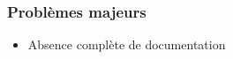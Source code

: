 \documentclass{beamer}
\begin{document}
\begin{frame}
    \frametitle{Problèmes majeurs}

    \begin{itemize}
        \item Absence complète de documentation %
    \end{itemize}
\end{frame}
\end{document}
